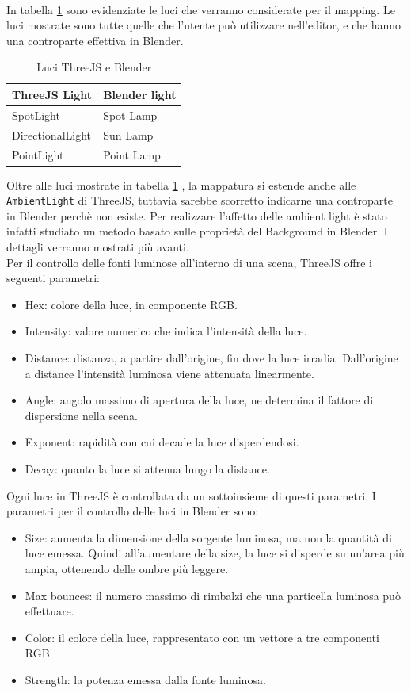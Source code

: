 \\
In tabella \ref{light_table} sono evidenziate le luci che verranno considerate per il mapping. Le luci mostrate sono tutte quelle che l’utente può utilizzare nell’editor, e che hanno una controparte effettiva in Blender.
\begin{table}[]
\centering
\caption{Luci ThreeJS e Blender}
\label{light_table}
\begin{tabular}{|l|l|}
\hline
\textbf{ThreeJS Light} & \textbf{Blender light} \\ \hline
SpotLight & Spot Lamp \\ \hline
DirectionalLight & Sun Lamp \\ \hline
PointLight & Point Lamp \\ \hline
\end{tabular}
\end{table}
Oltre alle luci mostrate in tabella \ref{light_table} , la mappatura si estende anche alle \texttt{AmbientLight} di ThreeJS, tuttavia sarebbe scorretto indicarne una controparte in Blender perchè non esiste. Per realizzare l’affetto delle ambient light è stato infatti studiato un metodo basato sulle proprietà del Background in Blender. I dettagli verranno mostrati più avanti.
\\
Per il controllo delle fonti luminose all’interno di una scena, ThreeJS offre i seguenti parametri:
\begin{itemize}
\item Hex: colore della luce, in componente RGB.
\item Intensity: valore numerico che indica l’intensità della luce.
\item Distance: distanza, a partire dall’origine, fin dove la luce irradia. Dall’origine a distance l’intensità luminosa viene attenuata linearmente.
\item Angle: angolo massimo di apertura della luce, ne determina il fattore di dispersione nella scena.
\item Exponent: rapidità con cui decade la luce disperdendosi.
\item Decay: quanto la luce si attenua lungo la distance.
\end{itemize}
Ogni luce in ThreeJS è controllata da un sottoinsieme di questi parametri. 
I parametri per il controllo delle luci in Blender sono:
\begin{itemize}
\item Size: aumenta la dimensione della sorgente luminosa, ma non la quantità di luce emessa. Quindi all’aumentare della size, la luce si disperde su un’area più ampia, ottenendo delle ombre più leggere.
\item Max bounces: il numero massimo di rimbalzi che una particella luminosa può effettuare.
\item Color: il colore della luce, rappresentato con un vettore a tre componenti RGB.
\item Strength: la potenza emessa dalla fonte luminosa.
\end{itemize}
